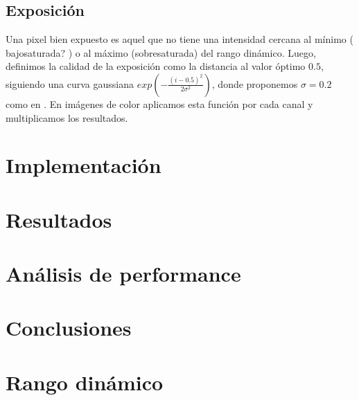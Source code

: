 \documentclass[a4paper,10pt]{article}
\newcommand{\attention}[1]{ {\color{red}#1} }
\begin{document}
        \subsection{Exposición}

            Una pixel bien expuesto es aquel que no tiene una intensidad cercana al mínimo (\attention{bajosaturada?}) o al máximo (sobresaturada) del rango dinámico. Luego, definimos la calidad de la exposición como la distancia al valor óptimo $0.5$, siguiendo una curva gaussiana $exp(-\frac{(i-0.5)^2}{2\sigma^2})$, donde proponemos $\sigma = 0.2$ como en \cite{DBLP:conf/pg/MertensKR07}. En imágenes de color aplicamos esta función por cada canal y multiplicamos los resultados.

    \section{Implementación}

    \section{Resultados}

    \section{Análisis de performance}

    \section{Conclusiones}

    \appendix

    \section{Rango dinámico}
\end{document}

